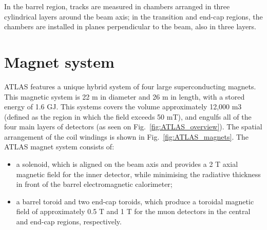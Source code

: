 In the barrel region, tracks are measured in chambers arranged in three cylindrical layers
around the beam axis; in the transition and end-cap regions, the chambers are installed in planes
perpendicular to the beam, also in three layers.


\section{Magnet system}
\label{sec:ATLAS_magnets}

\begin{figure}
\end{figure}


ATLAS features a unique hybrid system of four large superconducting magnets. This magnetic
system is 22 m in diameter and 26 m in length, with a stored energy of 1.6 GJ. This systems covers the volume approximately 12,000 m3 (defined as the region in which the field exceeds 50 mT), and engulfs all of the four main layers of detectors (as seen on Fig.~\ref{fig:ATLAS_overview}). The spatial arrangement of the coil windings is shown in Fig.~\ref{fig:ATLAS_magnets}. The ATLAS magnet system consists of:

\begin{itemize}
\item a solenoid, which is aligned on the beam axis and provides a 2 T axial magnetic field for the inner detector, while minimising the radiative thickness in front of the
barrel electromagnetic calorimeter;
\item a barrel toroid and two end-cap toroids, which produce a
toroidal magnetic field of approximately 0.5 T and 1 T for the muon detectors in the central
and end-cap regions, respectively.
\end{itemize}

